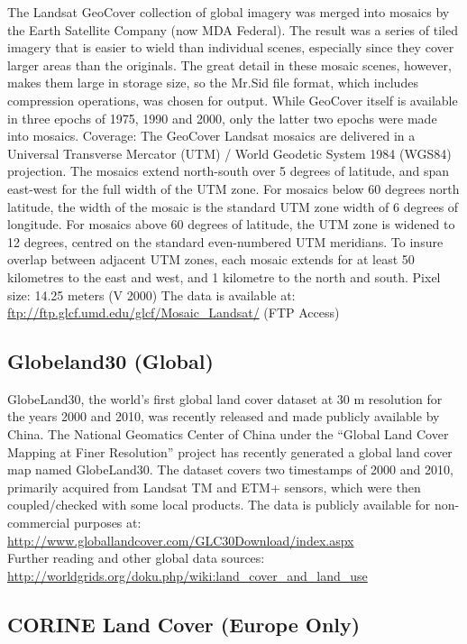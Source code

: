 \documentclass[]{book}
\theoremstyle{definition}
\theoremstyle{definition}
\theoremstyle{definition}
\theoremstyle{remark}
\begin{document}
The Landsat GeoCover collection of global imagery was merged into
mosaics by the Earth Satellite Company (now MDA Federal). The result was
a series of tiled imagery that is easier to wield than individual
scenes, especially since they cover larger areas than the originals. The
great detail in these mosaic scenes, however, makes them large in
storage size, so the Mr.Sid file format, which includes compression
operations, was chosen for output. While GeoCover itself is available in
three epochs of 1975, 1990 and 2000, only the latter two epochs were
made into mosaics. Coverage: The GeoCover Landsat mosaics are delivered
in a Universal Transverse Mercator (UTM) / World Geodetic System 1984
(WGS84) projection. The mosaics extend north-south over 5 degrees of
latitude, and span east-west for the full width of the UTM zone. For
mosaics below 60 degrees north latitude, the width of the mosaic is the
standard UTM zone width of 6 degrees of longitude. For mosaics above 60
degrees of latitude, the UTM zone is widened to 12 degrees, centred on
the standard even-numbered UTM meridians. To insure overlap between
adjacent UTM zones, each mosaic extends for at least 50 kilometres to
the east and west, and 1 kilometre to the north and south. Pixel size:
14.25 meters (V 2000) The data is available at:
\url{ftp://ftp.glcf.umd.edu/glcf/Mosaic_Landsat/} (FTP Access)

\subsection{Globeland30 (Global)}\label{globeland30-global}

GlobeLand30, the world's first global land cover dataset at 30 m
resolution for the years 2000 and 2010, was recently released and made
publicly available by China. The National Geomatics Center of China
under the ``Global Land Cover Mapping at Finer Resolution'' project has
recently generated a global land cover map named GlobeLand30. The
dataset covers two timestamps of 2000 and 2010, primarily acquired from
Landsat TM and ETM+ sensors, which were then coupled/checked with some
local products. The data is publicly available for non-commercial
purposes at:
\url{http://www.globallandcover.com/GLC30Download/index.aspx}\\
Further reading and other global data sources:
\url{http://worldgrids.org/doku.php/wiki:land_cover_and_land_use}

\subsection{CORINE Land Cover (Europe
Only)}\label{corine-land-cover-europe-only}
\end{document}

